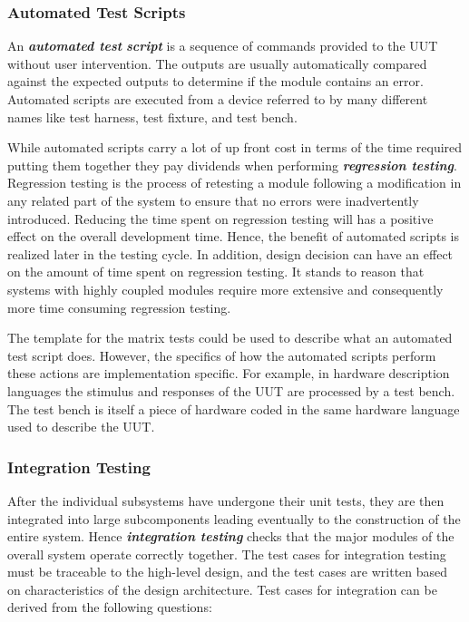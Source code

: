 \subsubsection*{\texorpdfstring{Automated Test Scripts
}{Automated Test Scripts }}\label{automated-test-scripts}

An \emph{\textbf{automated test}} \emph{\textbf{script}} is a sequence
of commands provided to the UUT without user intervention. The outputs
are usually automatically compared against the expected outputs to
determine if the module contains an error. Automated scripts are
executed from a device referred to by many different names like test
harness, test fixture, and test bench.

While automated scripts carry a lot of up front cost in terms of the
time required putting them together they pay dividends when performing
\emph{\textbf{regression testing}}. Regression testing is the process of
retesting a module following a modification in any related part of the
system to ensure that no errors were inadvertently introduced. Reducing
the time spent on regression testing will has a positive effect on the
overall development time. Hence, the benefit of automated scripts is
realized later in the testing cycle. In addition, design decision can
have an effect on the amount of time spent on regression testing. It
stands to reason that systems with highly coupled modules require more
extensive and consequently more time consuming regression testing.

The template for the matrix tests could be used to describe what an
automated test script does. However, the specifics of how the automated
scripts perform these actions are implementation specific. For example,
in hardware description languages the stimulus and responses of the UUT
are processed by a test bench. The test bench is itself a piece of
hardware coded in the same hardware language used to describe the UUT.

\subsubsection{Integration Testing}\label{integration-testing}

After the individual subsystems have undergone their unit tests, they
are then integrated into large subcomponents leading eventually to the
construction of the entire system. Hence \emph{\textbf{integration
testing}} checks that the major modules of the overall system operate
correctly together. The test cases for integration testing must be
traceable to the high-level design, and the test cases are written based
on characteristics of the design architecture. Test cases for
integration can be derived from the following questions:

